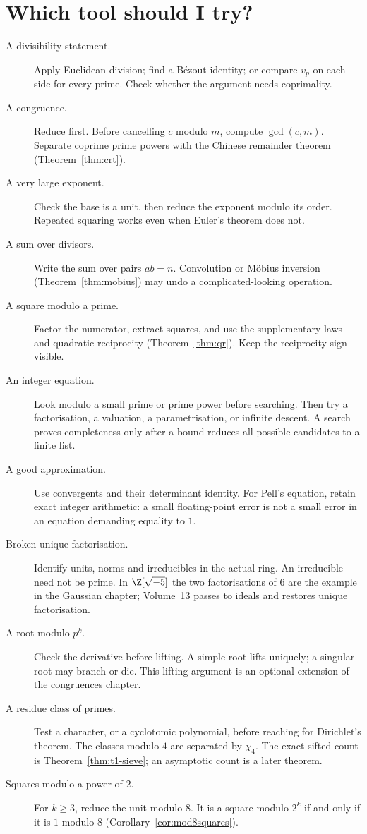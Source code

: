 \section*{Which tool should I try?}
\begin{description}
\item[A divisibility statement.] Apply Euclidean division; find a B\'ezout identity; or compare $v_p$ on each
side for every prime. Check whether the argument needs coprimality.
\item[A congruence.] Reduce first. Before cancelling $c$ modulo $m$, compute $\gcd(c,m)$. Separate coprime prime
powers with the Chinese remainder theorem (Theorem~\ref{thm:crt}).
\item[A very large exponent.] Check the base is a unit, then reduce the exponent modulo its order. Repeated
squaring works even when Euler's theorem does not.
\item[A sum over divisors.] Write the sum over pairs $ab=n$. Convolution or M\"obius inversion
(Theorem~\ref{thm:mobius}) may undo a complicated-looking operation.
\item[A square modulo a prime.] Factor the numerator, extract squares, and use the supplementary laws and
quadratic reciprocity (Theorem~\ref{thm:qr}). Keep the reciprocity sign visible.
\item[An integer equation.] Look modulo a small prime or prime power before searching. Then try a factorisation,
a valuation, a parametrisation, or infinite descent. A search proves completeness only after a bound reduces all possible candidates
to a finite list.
\item[A good approximation.] Use convergents and their determinant identity. For Pell's equation, retain exact
integer arithmetic: a small floating-point error is not a small error in an equation demanding equality to $1$.
\item[Broken unique factorisation.] Identify units, norms and irreducibles in the actual ring. An irreducible need
not be prime. In $\Z[\sqrt{-5}]$ the two factorisations of $6$ are the example in the Gaussian chapter; Volume~13 passes to ideals and restores unique factorisation.
\item[A root modulo $p^k$.] Check the derivative before lifting. A simple root lifts uniquely; a singular root
may branch or die. This lifting argument is an optional extension of the congruences chapter.
\item[A residue class of primes.] Test a character, or a cyclotomic polynomial, before reaching for Dirichlet's theorem. The classes modulo $4$ are separated by $\chi_4$. The exact sifted count is Theorem~\ref{thm:t1-sieve}; an asymptotic count is a later theorem.
\item[Squares modulo a power of $2$.] For $k\ge3$, reduce the unit modulo $8$. It is a square modulo $2^k$ if and only if it is $1$ modulo $8$ (Corollary~\ref{cor:mod8squares}).
\end{description}

